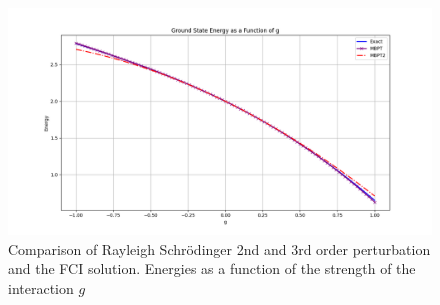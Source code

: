 \documentclass[a4paper,12pt]{article}
\begin{document}
\begin{figure}[h!]
    \centering
    \includegraphics[scale = 0.5]{Figure_8.png}
    \caption{Comparison of Rayleigh Schrödinger 2nd and 3rd order perturbation and the  FCI solution.
    Energies as a function of the strength of the interaction $g$}
    \label{fig:fig8}
\end{figure}
\end{document}
